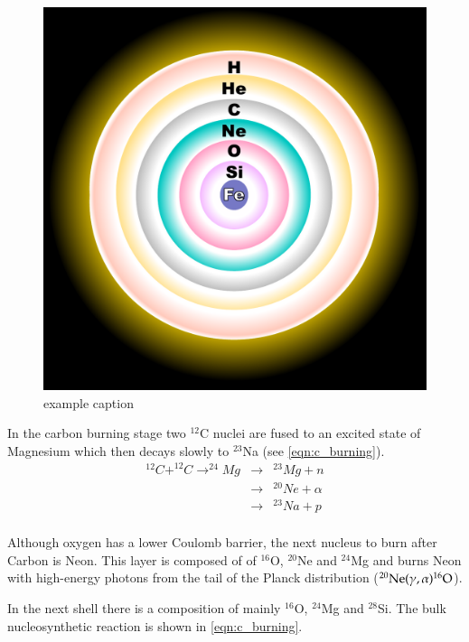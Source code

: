 \begin{figure}[htbp] %
   \centering
   \includegraphics[width=\textwidth]{chapter_intro/plots/fusion_shells.pdf} 
   \caption{example caption}
   \label{fig:fusion_shells}
\end{figure}


In the carbon burning stage two $^{12}$C nuclei are fused to an excited state of Magnesium which then decays slowly to $^{23}$Na (see \ref{eqn:c_burning}).
\begin{eqnarray}
^{12}C+^{12}C\rightarrow^{24}Mg&\rightarrow&^{23}Mg+n \nonumber \\
	&\rightarrow&^{20}Ne + \alpha \nonumber \\
	&\rightarrow&^{23}Na +p \nonumber \\
	\label{eqn:c_burning}
\end{eqnarray}

Although oxygen has a lower Coulomb barrier, the next nucleus to burn after Carbon is Neon. This layer is composed of of  $^{16}$O, $^{20}$Ne and $^{24}$Mg and burns Neon with high-energy photons from the tail of the Planck distribution ($\rm ^{20}Ne(\gamma,\alpha)^{16}O$). 

In the next shell there is a composition of mainly $^{16}$O, $^{24}$Mg and $^{28}$Si. The bulk nucleosynthetic reaction is shown in \ref{eqn:c_burning}. 

